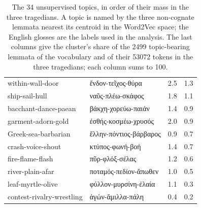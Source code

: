 \documentclass{article}
\theoremstyle{plain}
\theoremstyle{definition}
\theoremstyle{remark}
\begin{document}
\begin{table}[htbp]
\begin{tabular*}{\textwidth}{@{\extracolsep{\fill}}llrr}
within-wall-door & ἔνδον-τεῖχος-θύρα & 2.5 & 1.3 \\
ship-sail-hull & ναῦς-πλέω-σκάφος & 1.8 & 1.1 \\
bacchant-dance-paean & βάκχη-χορεύω-παιάν & 1.4 & 0.9 \\
garment-adorn-gold & ἐσθής-κοσμέω-χρυσός & 2.0 & 0.9 \\
Greek-sea-barbarian & ἕλλην-πόντιος-βάρβαρος & 0.9 & 0.7 \\
crash-voice-shout & κτύπος-φωνή-βοή & 1.4 & 0.7 \\
fire-flame-flash & πῦρ-φλόξ-σέλας & 1.2 & 0.6 \\
river-plain-afar & ποταμός-πεδίον-ἄπωθεν & 1.0 & 0.5 \\
leaf-myrtle-olive & φύλλον-μυρσίνη-ἐλαία & 1.1 & 0.3 \\
contest-rivalry-wrestling & ἀγών-ἅμιλλα-πάλη & 0.4 & 0.2 \\
\bottomrule
\end{tabular*}
\caption{The 34 unsupervised topics, in order of their mass in the three tragedians. A topic is named by the three non-cognate lemmata nearest its centroid in the Word2Vec space; the English glosses are the labels used in the analysis. The last columns give the cluster's share of the 2499 topic-bearing lemmata of the vocabulary and of their 53072 tokens in the three tragedians; each column sums to 100.}
\label{tab:topics}
\end{table}
\end{document}
